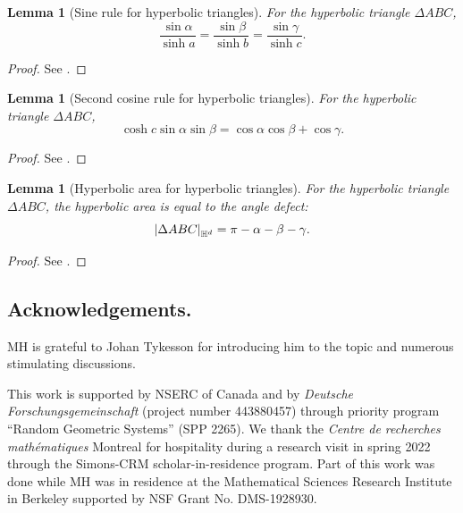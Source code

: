 \documentclass[10pt,a4paper,dvipsnames]{article}
\newtheorem{lemma}[theorem]{Lemma}
\theoremstyle{definition}
\theoremstyle{remark}
\newcommand{\HypDim}{{\mathbb{H}^d}}
\DeclarePairedDelimiter\abs{\lvert}{\rvert}
\newcommand{\habsd}[1]{\abs*{#1}_\HypDim}
\numberwithin{equation}{section}
\begin{document}
\begin{appendix}
\begin{lemma}[Sine rule for hyperbolic triangles]\label{lem:sinerule}
    For the hyperbolic triangle $\Delta ABC$,
    \begin{equation}
        \frac{\sin \alpha}{\sinh a} = \frac{\sin \beta}{\sinh b} = \frac{\sin \gamma}{\sinh c}.
    \end{equation}
\end{lemma}
\begin{proof}
    See \cite[Corollary~32.14]{martin2012foundations}.
\end{proof}

\begin{lemma}[Second cosine rule for hyperbolic triangles]\label{lem:secondcosinerule}
    For the hyperbolic triangle $\Delta ABC$,
    \begin{equation}
        \cosh c \sin \alpha \sin \beta = \cos \alpha \cos \beta + \cos \gamma.
    \end{equation}
\end{lemma}
\begin{proof}
    See \cite[Corollary~32.16]{martin2012foundations}.
\end{proof}

\begin{lemma}[Hyperbolic area for hyperbolic triangles]\label{lem:areaoftriangles}
    For the hyperbolic triangle $\Delta ABC$, the hyperbolic area is equal to the angle defect:
    \begin{equation}
        \habsd{\Delta ABC} = \pi - \alpha - \beta - \gamma.
    \end{equation}
\end{lemma}
\begin{proof}
    See \cite[Chapter~33.2]{martin2012foundations}.
\end{proof}
    
\end{appendix}

\subsection*{Acknowledgements.} 
MH is grateful to Johan Tykesson for introducing him to the topic and numerous stimulating discussions.  

This work is supported by NSERC of Canada and by 
\textit{Deutsche Forschungsgemeinschaft} (project number 443880457) through priority program ``Random Geometric Systems'' (SPP 2265). 
We thank the \emph{Centre de recherches math\'ematiques} Montreal for hospitality during a research visit in spring 2022 through the Simons-CRM scholar-in-residence program. 
Part of this work was done while MH was in residence at the Mathematical Sciences Research Institute in Berkeley supported by NSF Grant No. DMS-1928930.


{}

\end{document}
